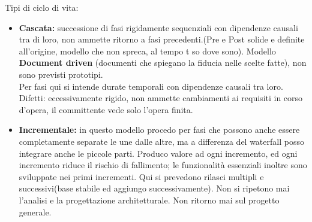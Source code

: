 Tipi di ciclo di vita:
\begin{itemize}
	\item \textbf{Cascata:} successione di fasi rigidamente sequenziali con dipendenze causali tra di loro, non ammette ritorno a fasi precedenti.(Pre e Post solide e definite all'origine, modello che non spreca, al tempo t so dove sono). Modello \textbf{Document driven} (documenti che spiegano la fiducia nelle scelte fatte), non sono previsti prototipi.\\
	Per fasi qui si intende durate temporali con dipendenze causali tra loro.
	Difetti: eccessivamente rigido, non ammette cambiamenti ai requisiti in corso d'opera, il committente vede solo l'opera finita.
	\item \textbf{Incrementale:} in questo modello procedo per fasi che possono anche essere completamente separate le une dalle altre, ma a differenza del waterfall posso integrare anche le piccole parti. Produco valore ad ogni incremento, ed ogni incremento riduce il rischio di fallimento; le funzionalità essenziali inoltre sono sviluppate nei primi incrementi.
	Qui si prevedono rilasci multipli e successivi(base stabile ed aggiungo successivamente). Non si ripetono mai l'analisi e la progettazione architetturale. Non ritorno mai sul progetto generale.\\
	

\end{itemize}
